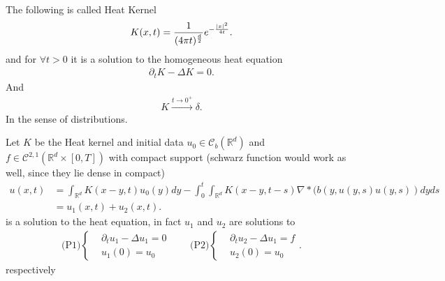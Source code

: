 \begin{definition}
 The following is called Heat Kernel
 \begin{align*}
  K(x,t) = \frac{1}{(4\pi t)^{\frac{d}{2}} } e^{-\frac{\lvert x\rvert^2}{4t}} 
 .\end{align*}
 and for $\forall  t > 0 $ it is a solution to the homogeneous heat equation
 \begin{align*}
  \partial_t K - \Delta K  = 0
 .\end{align*}
 And 
 \begin{align*}
   K \xrightarrow{t \to 0^{+} } \delta 
 .\end{align*}
 In the sense of distributions.
\end{definition}
\begin{theorem}
  Let $K$  be the Heat kernel and initial data $u_{0} \in \mathcal{C}_b(\mathbb{R}^{d} )$ and $f \in  \mathcal{C}^{2,1}(\mathbb{R}^{d} \times  [0,T]) $ with compact support (schwarz function would work as well, since they lie dense in compact)
\begin{align*}
    u(x,t) &=  \int_{\mathbb{R}^{d} } K(x-y,t) u_0(y) dy - \int_0^{t} \int_{\mathbb{R}^{d} }  K(x-y,t-s) \nabla * (b(y,u(y,s)u(y,s))dy ds \\
           &= u_{1}(x,t) + u_{2}(x,t)
  .\end{align*}
  is a solution to the heat equation, in fact $u_{1}$ and $u_{2}$ are solutions to
  \begin{align*}
    \text{(P1)}\begin{cases}
      &\partial_t u_{1} - \Delta u_{1} = 0 \\
      &u_{1}(0) = u_{0}
    \end{cases}
    \qquad 
    \text{(P2)}\begin{cases}
      &\partial_t u_{2} - \Delta u_{1} = f \\
      &u_{2}(0) = u_{0}
    \end{cases}
  .\end{align*}
  respectively
\end{theorem}
